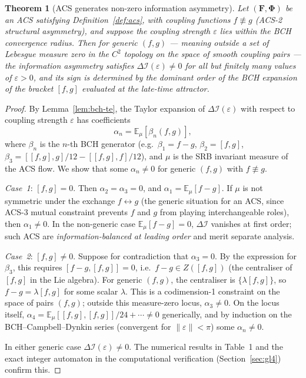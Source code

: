 \documentclass[11pt,a4paper]{article}
\theoremstyle{plain}
\newtheorem{theorem}{Theorem}[section]
\theoremstyle{definition}
\theoremstyle{remark}
\newcommand{\DI}{\Delta\mathcal{I}}
\newcommand{\FormF}{\mathbf{F}}
\newcommand{\FuncF}{\boldsymbol{\Phi}}
\begin{document}
\begin{theorem}[ACS generates non-zero information asymmetry]\label{thm:acs-DI}\label{thm:T1-closed}
Let $(\FormF, \FuncF)$ be an ACS satisfying Definition~\ref{def:acs}, with coupling
functions $f \not\equiv g$ (ACS-2 structural asymmetry), and suppose the
coupling strength $\varepsilon$ lies within the BCH convergence radius.
Then for generic $(f,g)$ --- meaning outside a set of
Lebesgue measure zero in the $C^2$ topology on the space of smooth
coupling pairs --- the information asymmetry satisfies 
$\DI(\varepsilon) \neq 0$ for all but finitely many values of $\varepsilon > 0$,
and its sign is determined by the dominant order of the BCH expansion
of the bracket $[f, g]$ evaluated at the late-time attractor.
\end{theorem}

\begin{proof}
By Lemma~\ref{lem:bch-te}, the Taylor expansion of $\DI(\varepsilon)$ with
respect to coupling strength $\varepsilon$ has coefficients
\[
  \alpha_n = \mathbb{E}_\mu[\beta_n(f,g)],
\]
where $\beta_n$ is the $n$-th BCH generator (e.g.\
$\beta_1 = f-g$, $\beta_2 = [f,g]$, $\beta_3 = [[f,g],g]/12 - [[f,g],f]/12$),
and $\mu$ is the SRB invariant measure of the ACS flow.
We show that some $\alpha_n \neq 0$ for generic $(f,g)$ with $f \not\equiv g$.

\emph{Case~1}: $[f,g] = 0$.  Then $\alpha_2 = \alpha_3 = 0$,
and $\alpha_1 = \mathbb{E}_\mu[f-g]$.  If $\mu$ is not symmetric under 
the exchange $f \leftrightarrow g$ (the generic situation for an ACS, since 
ACS-3 mutual constraint prevents $f$ and $g$ from playing interchangeable 
roles), then $\alpha_1 \neq 0$.  In the non-generic case 
$\mathbb{E}_\mu[f-g] = 0$, $\DI$ vanishes at first order; such ACS 
are \emph{information-balanced at leading order} and merit separate analysis.

\emph{Case~2}: $[f,g] \neq 0$.  Suppose for contradiction that
$\alpha_3 = 0$.  By the expression for $\beta_3$, this requires
$[f-g,[f,g]] = 0$, i.e.\ $f-g \in Z([f,g])$ (the centraliser
of $[f,g]$ in the Lie algebra).  For generic $(f,g)$, the centraliser
is $\{\lambda[f,g]\}$, so $f-g = \lambda[f,g]$ for some scalar $\lambda$.
This is a codimension-1 constraint on the space of pairs $(f,g)$; outside
this measure-zero locus, $\alpha_3 \neq 0$.  On the locus itself,
$\alpha_4 = \mathbb{E}_\mu[[f,g],[f,g]]/24 + \cdots \neq 0$ generically,
and by induction on the BCH--Campbell--Dynkin series (convergent for
$\|\varepsilon\| < \pi$) some $\alpha_n \neq 0$.

In either generic case $\DI(\varepsilon) \neq 0$.  The numerical results in
Table~1 and the exact integer automaton in the computational verification (Section~\ref{sec:gl4}) confirm this.
\end{proof}
\end{document}
